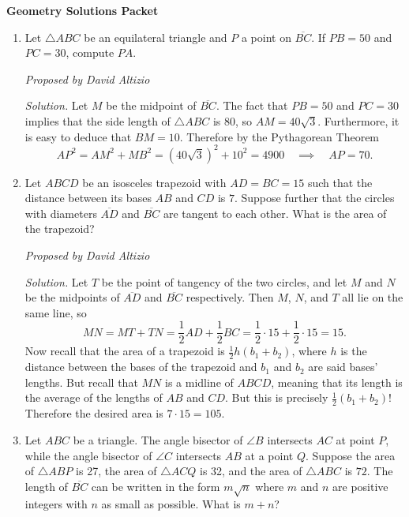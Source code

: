 \documentclass[10pt]{article}
\newcommand{\proposed}[1]
{
\vspace{5pt}
\noindent\textit{Proposed by #1}
}
\newcommand{\solution}
{
\vspace{5pt}
\noindent\textit{Solution.}\qquad
}
\newcounter{enum}
\begin{document}
\begin{center}
\huge\textbf{Geometry Solutions Packet}\normalsize

\vspace{3pt}
\end{center}

\begin{enumerate}

\item Let $\triangle ABC$ be an equilateral triangle and $P$ a point on $\overline{BC}$.  If $PB=50$ and $PC=30$, compute $PA$.

\proposed{David Altizio}

\solution Let $M$ be the midpoint of $\overline{BC}$.  The fact that $PB=50$ and $PC=30$ implies that the side length of $\triangle ABC$ is $80$, so $AM=40\sqrt 3$.  Furthermore, it is easy to deduce that $BM=10$.  Therefore by the Pythagorean Theorem \[AP^2=AM^2+MB^2=(40\sqrt3)^2+10^2=4900\quad\implies\quad AP=\boxed{70}.\]

\item Let $ABCD$ be an isosceles trapezoid with $AD=BC=15$ such that the distance between its bases $AB$ and $CD$ is $7$.  Suppose further that the circles with diameters $\overline{AD}$ and $\overline{BC}$ are tangent to each other.  What is the area of the trapezoid?

\proposed{David Altizio}

\solution Let $T$ be the point of tangency of the two circles, and let $M$ and $N$ be the midpoints of $\overline{AD}$ and $\overline{BC}$ respectively.  Then $M$, $N$, and $T$ all lie on the same line, so \[MN=MT+TN=\frac12AD+\frac12BC = \frac12\cdot 15+\frac12\cdot 15 = 15.\] Now recall that the area of a trapezoid is $\tfrac12h(b_1+b_2)$, where $h$ is the distance between the bases of the trapezoid and $b_1$ and $b_2$ are said bases' lengths.  But recall that $MN$ is a midline of $ABCD$, meaning that its length is the average of the lengths of $AB$ and $CD$.  But this is precisely $\tfrac12(b_1+b_2)$!  Therefore the desired area is $7\cdot 15=\boxed{105}$.

\item Let $ABC$ be a triangle.  The angle bisector of $\angle B$ intersects $AC$ at point $P$, while the angle bisector of $\angle C$ intersects $AB$ at a point $Q$.  Suppose the area of $\triangle ABP$ is 27, the area of $\triangle ACQ$ is 32, and the area of $\triangle ABC$ is $72$.  The length of $\overline{BC}$ can be written in the form $m\sqrt n$ where $m$ and $n$ are positive integers with $n$ as small as possible.  What is $m+n$?


\end{enumerate}
\end{document}
